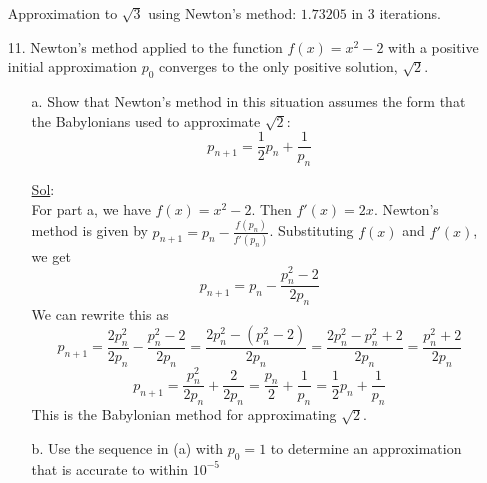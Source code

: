 \begin{enumerate}
    Approximation to \( \sqrt{3} \) using Newton's method: \(
    \boxed{1.73205} \) in 3 iterations.

  \item[11.] Newton's method applied to the function \( f(x) = x^2 -2
    \) with a positive initial approximation \( p_0 \) converges to
    the only positive solution, \( \sqrt{2} \).
    \begin{enumerate}
      \item[a.] Show that Newton's method in this situation assumes
        the form that the Babylonians used to approximate \( \sqrt{2} \):
        \[
          p_{n + 1} = \frac{1}{2} p_n + \frac{1}{p_n}
        \]

        \underline{Sol}:\\
        For part a, we have \( f(x) = x^2 - 2 \). Then \( f'(x) = 2x \).
        Newton's method is given by \( p_{n+1} = p_n -
        \frac{f(p_n)}{f'(p_n)} \).
        Substituting \( f(x) \) and \( f'(x) \), we get
        \[
          p_{n+1} = p_n - \frac{p_n^2 - 2}{2p_n}
        \]
        We can rewrite this as
        \[
          p_{n+1} = \frac{2p_n^2}{2p_n} - \frac{p_n^2 - 2}{2p_n} =
          \frac{2p_n^2 - (p_n^2 - 2)}{2p_n} = \frac{2p_n^2 - p_n^2 +
          2}{2p_n} = \frac{p_n^2 + 2}{2p_n}
        \]
        \[
          p_{n+1} = \frac{p_n^2}{2p_n} + \frac{2}{2p_n} =
          \frac{p_n}{2} + \frac{1}{p_n} = \frac{1}{2} p_n + \frac{1}{p_n}
        \]
        This is the Babylonian method for approximating \( \sqrt{2} \).


      \item[b.] Use the sequence in (a) with \( p_0 = 1 \) to
        determine an approximation that is accurate to within \( 10^{-5} \)


\end{enumerate}
\end{enumerate}
